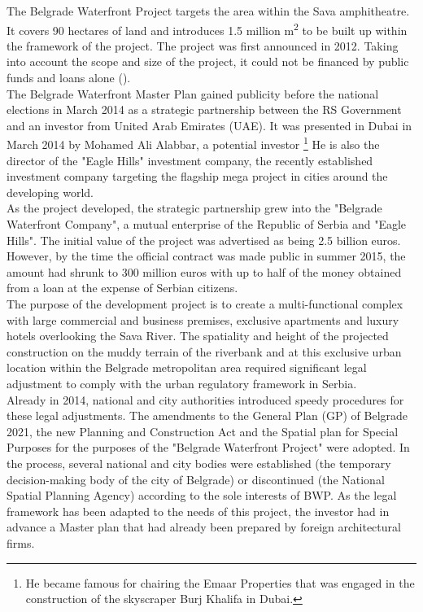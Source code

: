 \documentclass[11pt]{report}
\begin{document}
{{{{\begin{itemize}
The Belgrade Waterfront Project targets the area within the Sava amphitheatre. It covers 90 hectares of land and introduces 1.5 million m\textsuperscript{2}  to be built up within the framework of the project. The project was first announced in 2012. Taking into account the scope and size of the project, it could not be financed by public funds and loans alone (\href{Vukmirovic}{\citealt{doytchinov_belgrade:_2015}}).
\\

The Belgrade  Waterfront Master Plan gained publicity before the national elections in March 2014 as a strategic partnership between the RS Government and an investor from United Arab Emirates (UAE).
It was presented in Dubai in March 2014 by  Mohamed Ali Alabbar, a potential investor
\footnote{He became famous for chairing the Emaar Properties that was engaged in the construction of the  skyscraper Burj Khalifa in Dubai.}
He is also the  director  of the  "Eagle Hills" investment company, the recently established investment company targeting the  flagship mega project in cities around the developing world.
\\

As the project developed, the strategic partnership grew into the "Belgrade Waterfront Company", a mutual enterprise of the Republic of Serbia  and "Eagle Hills". The initial value of the project was advertised as being 2.5 billion euros. However, by the time the official contract was made public in summer 2015, the amount had shrunk to 300 million euros with up to half of the money obtained from a loan at the expense of Serbian citizens.
\\

The purpose of the development project is to create a multi-functional complex with large commercial and business premises, exclusive apartments and luxury hotels overlooking the Sava River. The spatiality and height of the projected construction on the muddy terrain of the riverbank and at this exclusive urban location within the Belgrade metropolitan area required significant legal adjustment to comply with the urban regulatory framework in Serbia.
\\

Already in 2014, national and city authorities introduced speedy procedures for these legal adjustments. The amendments to the General Plan (GP) of Belgrade 2021, the new Planning and Construction Act and the Spatial plan for Special Purposes for the purposes of the "Belgrade Waterfront Project" were adopted. In the process, several national and city bodies were established (the temporary decision-making body of the city of Belgrade) or discontinued (the National Spatial Planning Agency) according to the sole interests of BWP. As the legal framework has been adapted to the needs of this project, the investor had in advance a Master plan that had already been prepared by foreign architectural firms.
\\


\end{itemize}}}}}
\end{document}
